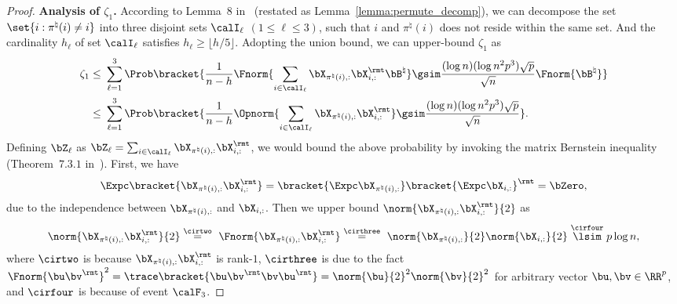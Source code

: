 \documentclass[11pt]{article}
\def \bBtrue {\bB^{\natural}}
\begin{document}
\begin{proof}
\vsp \noindent
\textbf{Analysis of $\zeta_1$.}
According to Lemma~$8$ in~\citet{pananjady2018linear} (restated as Lemma~\ref{lemma:permute_decomp}),
we can decompose the set $\set{i: \pi^{\natural}(i)\neq i}$
into three disjoint sets $\calI_{\ell}$ $(1\leq \ell \leq 3)$,
such that $i$ and $\pi^{\natural}(i)$ does not reside within the same set.
And the cardinality $h_{\ell}$ of set $\calI_{\ell}$ satisfies
$ h_{\ell} \geq \lfloor h/5 \rfloor$.
Adopting the union bound, we can upper-bound
$\zeta_1$ as
\begin{align}
\zeta_1 \leq~& \sum_{\ell =1}^3 \Prob\bracket{\frac{1}{n-h}\Fnorm{\sum_{i\in \calI_{\ell}}
\bX_{\pi^{\natural}(i), :}\bX_{i, :}^{\rmt}\bBtrue} \gsim
\frac{(\log n)(\log n^2 p^3)\sqrt{p}}{\sqrt{n}}\Fnorm{\bBtrue}} \notag \\
\leq ~&
\sum_{\ell=1}^3 \Prob\bracket{\frac{1}{n-h}\Opnorm{\sum_{i\in \calI_{\ell}}
\bX_{\pi^{\natural}(i), :}\bX_{i, :}^{\rmt}} \gsim
\frac{(\log n)(\log n^2 p^3)\sqrt{p}}{\sqrt{n}}}.
\label{eq:event6_zeta1}
\end{align}
Defining $\bZ_{\ell}$ as
$\bZ_{\ell} = \sum_{i\in \calI_{\ell}}\bX_{\pi^{\natural}(i), :}\bX^{\rmt}_{i, :}$,
we would bound the above probability by invoking the matrix
Bernstein inequality (Theorem~$7.3.1$ in~\citet{tropp2015introduction}).
First, we have
\begin{align*}
\Expc\bracket{\bX_{\pi^{\natural}(i), :}\bX^{\rmt}_{i, :}} =
\bracket{\Expc\bX_{\pi^{\natural}(i), :}}\bracket{ \Expc \bX_{i, :}}^{\rmt} = \bZero,
\end{align*}
due to the independence between $\bX_{\pi^{\natural}(i), :}$ and $\bX_{i, :}$.
Then we upper bound $\norm{\bX_{\pi^{\natural}(i), :}\bX_{i, :}^{\rmt}}{2}$ as
\begin{align*}
\norm{\bX_{\pi^{\natural}(i), :}\bX_{i, :}^{\rmt}}{2} \stackrel{\cirtwo}{=} \
\Fnorm{\bX_{\pi^{\natural}(i), :}\bX_{i, :}^{\rmt}} \stackrel{\cirthree}{=} \
\norm{\bX_{\pi^{\natural}(i), :}}{2} \norm{\bX_{i, :}}{2} \stackrel{\cirfour}{\lsim}
p\log n,
\end{align*}
where $\cirtwo$ is because $\bX_{\pi^{\natural}(i), :}\bX_{i, :}^{\rmt}$ is rank-$1$,
$\cirthree$ is due to the fact $\Fnorm{\bu\bv^{\rmt}}^2 = \trace\bracket{\bu \bv^{\rmt}\bv \bu^{\rmt}} = \norm{\bu}{2}^2 \norm{\bv}{2}^2$ for
arbitrary vector $\bu, \bv \in \RR^p$, and
$\cirfour$ is because of event $\calF_3$.


\end{proof}
\end{document}
